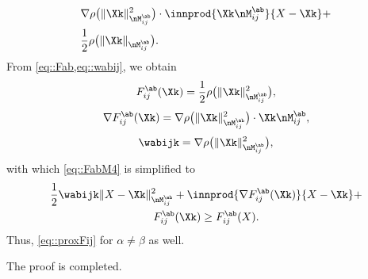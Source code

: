 \begin{enumerate}[leftmargin=0.45cm]
\begin{equation}
\begin{aligned}
& \nabla\rho\big(\|\Xk\|_{\nM_{ij}^{\ab}}^2\big)\cdot\innprod{\Xk\nM_{ij}^{\ab}}{X-\Xk} +\\
& \frac{1}{2}\rho\big(\|\Xk\|_{\nM_{ij}^{\ab}}\big).
\end{aligned}
\end{equation}
From \cref{eq::Fab,eq::wabij}, we obtain
\begin{equation}
\nonumber
F_{ij}^{\ab}(\Xk)=\frac{1}{2}\rho\big(\|\Xk\|_{\nM_{ij}^{\ab}}^2\big),
\end{equation}
\begin{equation}
\nonumber
\nabla F_{ij}^{\ab}(\Xk) = \nabla\rho\big(\|\Xk\|_{\nM_{ij}^{\ab}}^2\big)\cdot \Xk\nM_{ij}^{\ab},
\end{equation}
\begin{equation}
\nonumber
\wabijk = \nabla\rho\big(\|\Xk\|_{\nM_{ij}^{\ab}}^2\big),
\end{equation}
with which \cref{eq::FabM4} is simplified to
\begin{multline}
\nonumber
\frac{1}{2}\wabijk\|X-\Xk\|_{\nM_{ij}^{\ab}}^2+ \innprod{\nabla F_{ij}^{\ab}(\Xk)}{X-\Xk}+\\
F_{ij}^{\ab}(\Xk)\geq F_{ij}^{\ab}(X).
\end{multline}
Thus, \cref{eq::proxFij} for $\alpha\neq\beta$ as well.
\end{enumerate}
The proof is completed.


